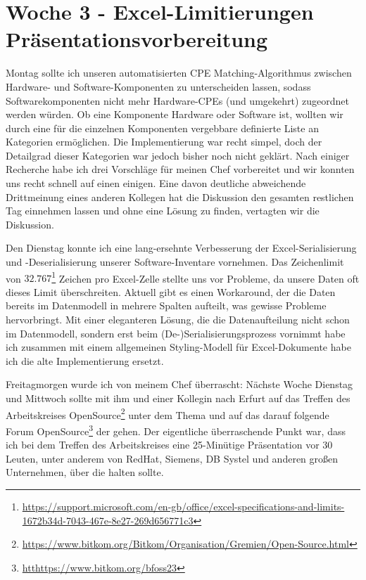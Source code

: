 \section{Woche 3 - Excel-Limitierungen \headerand Präsentationsvorbereitung} \label{sec:bericht-wo-3}


\lweekdaymarginpar{\weekdayMondayLong}

Montag sollte ich unseren automatisierten CPE Matching-Algorithmus zwischen Hardware- und Software-Komponenten zu unterscheiden lassen, sodass Softwarekomponenten nicht mehr Hardware-CPEs (und umgekehrt) zugeordnet werden würden.
Ob eine Komponente Hardware oder Software ist, wollten wir durch eine für die einzelnen Komponenten vergebbare definierte Liste an Kategorien ermöglichen.
Die Implementierung war recht simpel, doch der Detailgrad dieser Kategorien war jedoch bisher noch nicht geklärt.
Nach einiger Recherche habe ich drei Vorschläge für meinen Chef vorbereitet und wir konnten uns recht schnell auf einen einigen.
Eine davon deutliche abweichende Drittmeinung eines anderen Kollegen hat die Diskussion den gesamten restlichen Tag einnehmen lassen und ohne eine Lösung zu finden, vertagten wir die Diskussion.

\sweekdaymarginpar{\weekdayTuesdayShort, \weekdayWednesdayShort, \weekdayThursdayShort}

Den Dienstag konnte ich eine lang-ersehnte Verbesserung der Excel-Serialisierung und -Deserialisierung unserer Software-Inventare vornehmen.
Das Zeichenlimit von $32.767$\footnote{\url{https://support.microsoft.com/en-gb/office/excel-specifications-and-limits-1672b34d-7043-467e-8e27-269d656771c3}} Zeichen pro Excel-Zelle stellte uns vor Probleme, da unsere Daten oft dieses Limit überschreiten.
Aktuell gibt es einen Workaround, der die Daten bereits im Datenmodell in mehrere Spalten aufteilt, was gewisse Probleme hervorbringt.
Mit einer eleganteren Lösung, die die Datenaufteilung nicht schon im Datenmodell, sondern erst beim (De-)Serialisierungsprozess vornimmt habe ich zusammen mit einem allgemeinen Styling-Modell für Excel-Dokumente habe ich die alte Implementierung ersetzt.

\sweekdaymarginpar{\weekdayFridayLong}

Freitagmorgen wurde ich von meinem Chef überrascht:
Nächste Woche Dienstag und Mittwoch sollte mit ihm und einer Kollegin nach Erfurt auf das Treffen des Arbeitskreises OpenSource\footnote{\url{https://www.bitkom.org/Bitkom/Organisation/Gremien/Open-Source.html}} unter dem Thema  und auf das darauf folgende Forum OpenSource\footnote{\url{htthttps://www.bitkom.org/bfoss23}} der {\bitkom} gehen.
Der eigentliche überraschende Punkt war, dass ich bei dem Treffen des Arbeitskreises eine 25-Minütige Präsentation vor 30 Leuten, unter anderem von RedHat, Siemens, DB Systel und anderen großen Unternehmen, über die  halten sollte.

